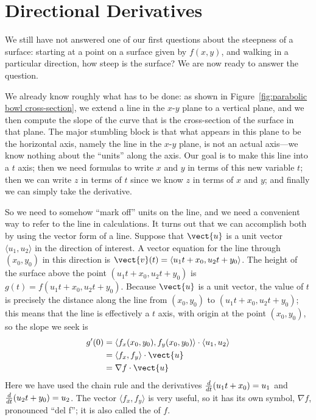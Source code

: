 \section{Directional Derivatives}\label{sec:DirectionalDerivatives}

We still have not answered one of our first questions about the
steepness of a surface: starting at a
point on a surface given by $f(x,y)$, and walking in a particular
direction, how steep is the surface? We are now ready to answer the
question.

We already know roughly what has to be done: as shown in
Figure~\ref{fig:parabolic bowl cross-section}, we extend a line in
the $x$-$y$ plane to a vertical plane, and we then compute the slope
of the curve that is the cross-section of the surface in that
plane. The major stumbling block is that what appears in this plane to
be the horizontal axis, namely the line in the $x$-$y$ plane, is not
an actual axis---we know nothing about the ``units'' along the
axis. Our goal is to make this line into a $t$ axis; then we need
formulas to write $x$ and $y$ in terms of this new variable $t$; then
we can write $z$ in terms of $t$ since we know $z$ in terms of $x$ and
$y$; and finally we can simply take the derivative.

So we need to somehow ``mark off'' units on the line, and we need a
convenient way to refer to the line in calculations. It turns out that
we can accomplish both by using the vector form of a line. Suppose
that $\vect{u}$ is a unit vector $\langle u_1,u_2\rangle$ in the
direction of interest. A vector equation for the line through
$(x_0,y_0)$ in this direction is $\vect{v}(t)=\langle
u_1t+x_0,u_2t+y_0\rangle$. The height of the surface above the point 
$(u_1t+x_0,u_2t+y_0)$ is $g(t)=f(u_1t+x_0,u_2t+y_0)$. Because $\vect{u}$
is a unit vector, the value of $t$ is precisely the distance along the
line from $(x_0,y_0)$ to $(u_1t+x_0,u_2t+y_0)$; this means that the
line is effectively a $t$ axis, with origin at the point $(x_0,y_0)$,
so the slope we seek is 
\begin{align*}
g'(0)&=\langle f_x(x_0,y_0),f_y(x_0,y_0)\rangle\cdot
\langle u_1,u_2\rangle	\\
&=\langle f_x,f_y\rangle\cdot\vect{u}	\\
&=\nabla f\cdot \vect{u}	\\
\end{align*}
Here we have used the chain rule and the derivatives
${d\over dt}(u_1t+x_0)=u_1$ and ${d\over dt}(u_2t+y_0)=u_2$.
The vector $\langle f_x,f_y\rangle$ is very useful, so it has its own
symbol, $\nabla f$, pronounced ``del f''; 
it is also called the
 of $f$.

